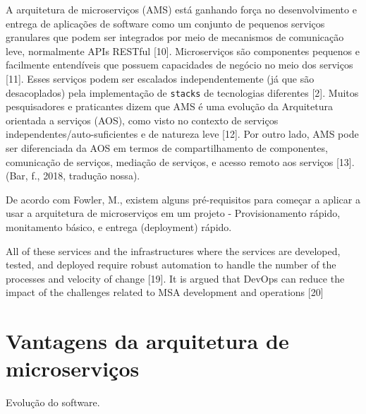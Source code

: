A arquitetura de microserviços (AMS) está ganhando força no desenvolvimento e entrega de aplicações de software como um conjunto de pequenos serviços granulares que podem ser integrados por meio de mecanismos de comunicação leve, normalmente APIs RESTful [10]. Microserviços são componentes pequenos e facilmente entendíveis que possuem capacidades de negócio no meio dos serviços [11]. Esses serviços podem ser escalados independentemente (já que são desacoplados) pela implementação de \texttt{stacks} de tecnologias diferentes [2]. Muitos pesquisadores e praticantes dizem que AMS é uma evolução da Arquitetura orientada a serviços (AOS), como visto no contexto de serviços independentes/auto-suficientes e de natureza leve [12]. Por outro lado, AMS pode ser diferenciada da AOS em termos de compartilhamento de componentes, comunicação de serviços, mediação de serviços, e acesso remoto aos serviços [13]. (Bar, f., 2018, tradução nossa).

De acordo com Fowler, M., existem alguns pré-requisitos para começar a aplicar a usar a arquitetura de microserviços em um projeto - Provisionamento rápido, monitamento básico, e entrega (deployment) rápido.



All of these services and the infrastructures where the services are developed, tested, and deployed require robust automation to handle the number of the processes and velocity of change [19]. It is argued that DevOps can reduce the impact of the challenges related to MSA development and operations [20]

\section{Vantagens da arquitetura de microserviços}

Evolução do software. 

